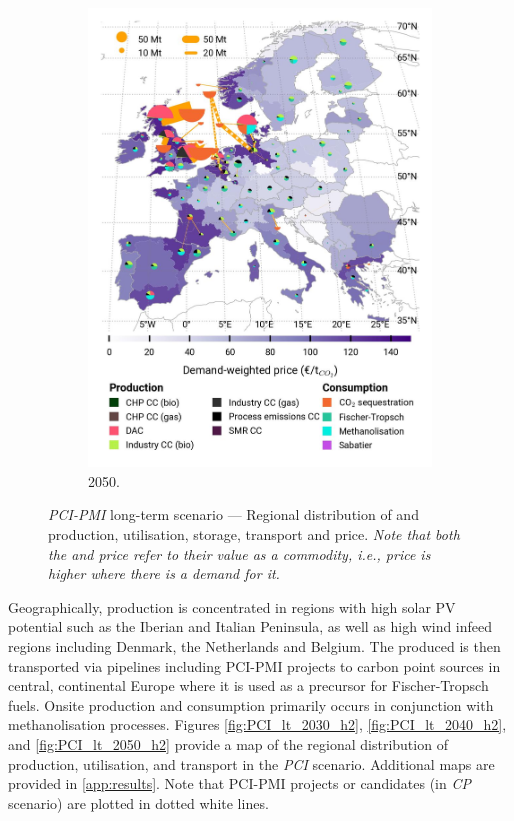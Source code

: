 \documentclass[preprint,12pt,sort&compress]{elsarticle}
\begin{document}
\begin{figure}[htbp]
\begin{subfigure}[t]{0.33\textwidth}
      \includegraphics[width=1\textwidth]{maps/pcipmi/base_s_adm___2050-balance_map_co2_stored} 
      \caption{ 2050.}
      \label{fig:PCI_lt_2050_co2}
  \end{subfigure}
  \vspace{0.3cm}
  \caption{\textit{PCI-PMI} long-term scenario --- Regional distribution of  and  production, utilisation, storage, transport and price. \textit{Note that both the  and  price refer to their value as a commodity, i.e., price is higher where there is a demand for it.}}
  \label{fig:PCI_lt}
\end{figure}

Geographically,  production is concentrated in regions with high solar PV potential such as the Iberian and Italian Peninsula, as well as high wind infeed regions including Denmark, the Netherlands and Belgium. The produced  is then transported via  pipelines including PCI-PMI projects to carbon point sources  in central, continental Europe where it is used as a precursor for Fischer-Tropsch fuels. Onsite  production and consumption primarily occurs in conjunction with methanolisation processes. Figures \ref{fig:PCI_lt_2030_h2}, \ref{fig:PCI_lt_2040_h2}, and \ref{fig:PCI_lt_2050_h2} provide a map of the regional distribution of  production, utilisation, and transport in the \textit{PCI} scenario. Additional maps are provided in \ref{app:results}. Note that PCI-PMI projects or candidates (in \textit{CP} scenario) are plotted in dotted white lines.
\end{document}
